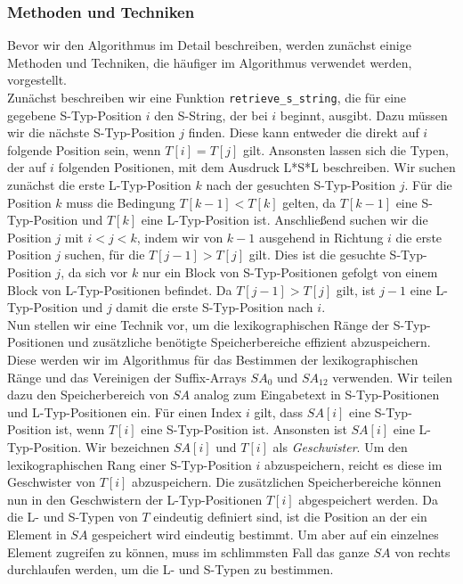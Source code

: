 \subsubsection{Methoden und Techniken}
\label{nzSufSort:intro:methods}

Bevor wir den Algorithmus im Detail beschreiben, werden zunächst einige Methoden und Techniken, die häufiger im Algorithmus verwendet werden, vorgestellt. \\
Zunächst beschreiben wir eine Funktion \texttt{retrieve\_s\_string}, die für eine gegebene S-Typ-Position $i$ den S-String, der bei $i$ beginnt, ausgibt. Dazu müssen wir die nächste S-Typ-Position $j$ finden. Diese kann entweder die direkt auf $i$ folgende Position sein, wenn $T[i]=T[j]$ gilt. Ansonsten lassen sich die Typen, der auf $i$ folgenden Positionen, mit dem Ausdruck L*S*L beschreiben. Wir suchen zunächst die erste L-Typ-Position $k$ nach der gesuchten S-Typ-Position $j$. Für die Position $k$ muss die Bedingung $T[k-1] < T[k]$ gelten, da $T[k-1]$ eine S-Typ-Position und $T[k]$ eine L-Typ-Position ist. Anschließend suchen wir die Position $j$ mit $i < j < k$, indem wir von $k-1$ ausgehend in Richtung $i$ die erste Position $j$ suchen, für die $T[j-1] > T[j]$ gilt. Dies ist die gesuchte S-Typ-Position $j$, da sich vor $k$ nur ein Block von S-Typ-Positionen gefolgt von einem Block von L-Typ-Positionen befindet. Da $T[j-1] > T[j]$ gilt, ist $j-1$ eine L-Typ-Position und $j$ damit die erste S-Typ-Position nach $i$. \\
Nun stellen wir eine Technik vor, um die lexikographischen Ränge der S-Typ-Positionen und zusätzliche benötigte Speicherbereiche effizient abzuspeichern. Diese werden wir im Algorithmus für das Bestimmen der lexikographischen Ränge und das Vereinigen der Suffix-Arrays $SA_0$ und $SA_{12}$ verwenden. Wir teilen dazu den Speicherbereich von $SA$ analog zum Eingabetext in S-Typ-Positionen und L-Typ-Positionen ein. Für einen Index $i$ gilt, dass $SA[i]$ eine S-Typ-Position ist, wenn $T[i]$ eine S-Typ-Position ist. Ansonsten ist $SA[i]$ eine L-Typ-Position. Wir bezeichnen $SA[i]$ und $T[i]$ als \textit{Geschwister}. Um den lexikographischen Rang einer S-Typ-Position $i$ abzuspeichern, reicht es diese im Geschwister von $T[i]$ abzuspeichern. Die zusätzlichen Speicherbereiche können nun in den Geschwistern der L-Typ-Positionen $T[i]$ abgespeichert werden. Da die L- und S-Typen von $T$ eindeutig definiert sind, ist die Position an der ein Element in $SA$ gespeichert wird eindeutig bestimmt. Um aber auf ein einzelnes Element zugreifen zu können, muss im schlimmsten Fall das ganze $SA$ von rechts durchlaufen werden, um die L- und S-Typen zu bestimmen.

